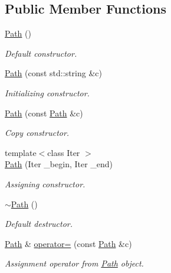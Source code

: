 \subsection*{Public Member Functions}
\begin{DoxyCompactItemize}
\item 
\hyperlink{class_d_d4hep_1_1_path_a43d8eda2bc0394eca5d44ded6556d434}{Path} ()
\begin{DoxyCompactList}\small\item\em Default constructor. \item\end{DoxyCompactList}\item 
\hyperlink{class_d_d4hep_1_1_path_a29df9b52c07dfecc7015aec057ffe113}{Path} (const std::string \&c)
\begin{DoxyCompactList}\small\item\em Initializing constructor. \item\end{DoxyCompactList}\item 
\hyperlink{class_d_d4hep_1_1_path_aacc0beb72c34b440b89ef40eeec0fe97}{Path} (const \hyperlink{class_d_d4hep_1_1_path}{Path} \&c)
\begin{DoxyCompactList}\small\item\em Copy constructor. \item\end{DoxyCompactList}\item 
{\footnotesize template$<$class Iter $>$ }\\\hyperlink{class_d_d4hep_1_1_path_a2f6484e284fb7e603c15dc3ef4cb15e8}{Path} (Iter \_\-begin, Iter \_\-end)
\begin{DoxyCompactList}\small\item\em Assigning constructor. \item\end{DoxyCompactList}\item 
\hyperlink{class_d_d4hep_1_1_path_ac39064d1578702ce969c7b1e1bcb5912}{$\sim$Path} ()
\begin{DoxyCompactList}\small\item\em Default destructor. \item\end{DoxyCompactList}\item 
\hyperlink{class_d_d4hep_1_1_path}{Path} \& \hyperlink{class_d_d4hep_1_1_path_a9d22ed81a818b6d7e982af1c4ea01dc4}{operator=} (const \hyperlink{class_d_d4hep_1_1_path}{Path} \&c)
\begin{DoxyCompactList}\small\item\em Assignment operator from \hyperlink{class_d_d4hep_1_1_path}{Path} object. \item\end{DoxyCompactList}\item 

\end{DoxyCompactItemize}
